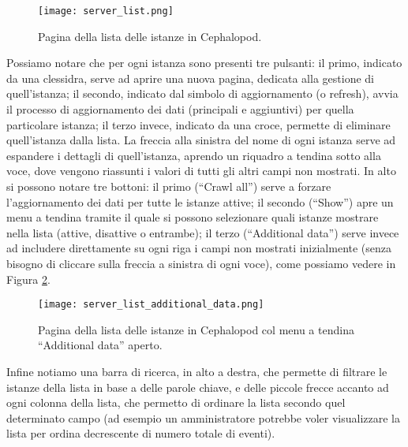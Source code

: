         	\begin{figure}[h!]
        		\begin{center}
        			\texttt{[image: server\_list.png]}
        		\end{center}
        		\caption[Lista delle istanze]{Pagina della lista delle istanze in Cephalopod.}
        		\label{fig:server_list}
        	\end{figure}
        	
        	Possiamo notare che per ogni istanza sono presenti tre pulsanti: il primo, indicato da una clessidra, serve ad aprire una nuova pagina, dedicata alla gestione di quell'istanza; il secondo, indicato dal simbolo di aggiornamento (o refresh), avvia il processo di aggiornamento dei dati (principali e aggiuntivi) per quella particolare istanza; il terzo invece, indicato da una croce, permette di eliminare quell'istanza dalla lista. La freccia alla sinistra del nome di ogni istanza serve ad espandere i dettagli di quell'istanza, aprendo un riquadro a tendina sotto alla voce, dove vengono riassunti i valori di tutti gli altri campi non mostrati. In alto si possono notare tre bottoni: il primo (``Crawl all'') serve a forzare l'aggiornamento dei dati per tutte le istanze attive; il secondo (``Show'') apre un menu a tendina tramite il quale si possono selezionare quali istanze mostrare nella lista (attive, disattive o entrambe); il terzo (``Additional data'') serve invece ad includere direttamente su ogni riga i campi non mostrati inizialmente (senza bisogno di cliccare sulla freccia a sinistra di ogni voce), come possiamo vedere in Figura \ref{fig:server_list_additional_data}.
        	
        	\begin{figure}[h!]
        		\begin{center}
        			\texttt{[image: server\_list\_additional\_data.png]}
        		\end{center}
        		\caption[Lista delle istanze (con menu a tendina aperto)]{Pagina della lista delle istanze in Cephalopod col menu a tendina ``Additional data'' aperto.}
        		\label{fig:server_list_additional_data}
        	\end{figure}
        	
        	Infine notiamo una barra di ricerca, in alto a destra, che permette di filtrare le istanze della lista in base a delle parole chiave, e delle piccole frecce accanto ad ogni colonna della lista, che permetto di ordinare la lista secondo quel determinato campo (ad esempio un amministratore potrebbe voler visualizzare la lista per ordina decrescente di numero totale di eventi).
        	
